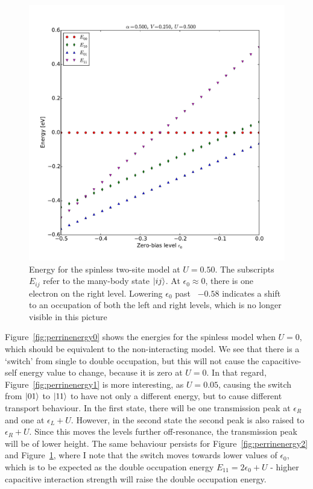 \begin{figure}[h]
    \centering
    \includegraphics[height=.45\textheight]{pdf/energy/perrin_distribution_u3.pdf}
    \caption{Energy for the spinless two-site model at $U=0.50$. The subscripts $E_{ij}$ refer to the many-body state $\ket{i j}$. At $\epsilon_0 \approx 0$, there is one electron on the right level. Lowering $\epsilon_0$ past ~$-0.58$ indicates a shift to an occupation of both the left and right levels, which is no longer visible in this picture  }
    \label{fig:perrinenergy3}
\end{figure}

Figure~\ref{fig:perrinenergy0} shows the energies for the spinless model when $U=0$, which should be equivalent to the non-interacting model. We see that there is a `switch' from single to double occupation, but this will not cause the capacitive-self energy value to change, because it is zero at $U=0$. In that regard, Figure~\ref{fig:perrinenergy1} is more interesting, as $U=0.05$, causing the switch from $\ket{01}$ to $\ket{11}$ to have not only a different energy, but to cause different transport behaviour. In the first state, there will be one transmission peak at $\epsilon_R$ and one at $\epsilon_L + U$. However, in the second state the second peak is also raised to $\epsilon_R+U$. Since this moves the levels further off-resonance, the transmission peak will be of lower height. The same behaviour persists for Figure~\ref{fig:perrinenergy2} and Figure~\ref{fig:perrinenergy3}, where I note that the switch moves towards lower values of $\epsilon_0$, which is to be expected as the double occupation energy $E_{11} = 2\epsilon_0 + U$ - higher capacitive interaction strength will raise the double occupation energy.
 
